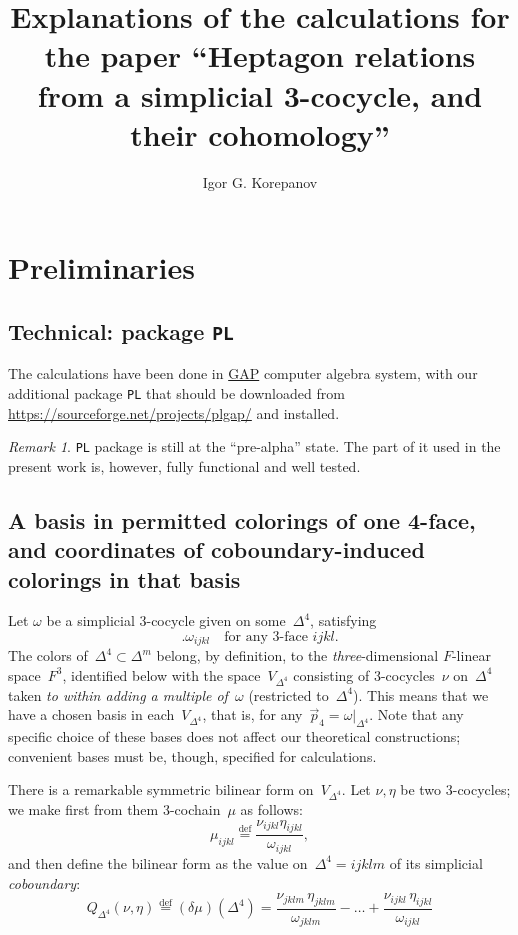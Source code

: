 \documentclass[12pt]{article}
\author{Igor G. Korepanov}
\title{Explanations of the calculations for the paper ``Heptagon relations from a simplicial 3-cocycle, and their cohomology''}
\date{}
\theoremstyle{definition}
\theoremstyle{remark}
\newtheorem*{remark}{Remark}
\begin{document}
\sloppy

\maketitle



\section{Preliminaries}\label{s:4f}

\subsection{Technical: package \texttt{PL}}

The calculations have been done in \href{https://www.gap-system.org/}{GAP} computer algebra system, with our additional package \texttt{PL} that should be downloaded from \href{https://sourceforge.net/projects/plgap/}{https://sourceforge.net/projects/plgap/} and installed.

\begin{remark}
 \texttt{PL} package is still at the ``pre-alpha'' state. The part of it used in the present work is, however, fully functional and well tested.
\end{remark}

\subsection{A basis in permitted colorings of one 4-face, and coordinates of coboundary-induced colorings in that basis}

Let $\omega$ be a simplicial 3-cocycle given on some~$\Delta^4$, satisfying
\begin{equation}\label{onv}.
 \omega _{ijkl} \quad \text{for any 3-face } ijkl.
\end{equation}
The colors of~$\Delta^4 \subset \Delta^m$ belong, by definition, to the \emph{three}-dimen\-sional $F$-linear space~$F^3$, identified below with the space~$V_{\Delta^4}$ consisting of 3-cocycles~$\nu$ on~$\Delta^4$ taken \emph{to within adding a multiple of~$\omega$} (restricted to~$\Delta^4$). This means that we have a chosen basis in each~$V_{\Delta^4}$, that is, for any~$\vec p_4 = \omega|_{\Delta^4}$. Note that any specific choice of these bases does not affect our theoretical constructions; convenient bases must be, though, specified for calculations.

There is a remarkable symmetric bilinear form on~$V_{\Delta^4}$. Let $\nu, \eta$ be two 3-cocycles; we make first from them 3-cochain~$\mu$ as follows:
\begin{equation}\label{mu}
\mu _{ijkl} \stackrel{\mathrm{def}}{=} \frac{\nu _{ijkl}\eta _{ijkl}}{\omega _{ijkl}},
\end{equation}
and then define the bilinear form as the value on~$\Delta^4 = ijklm$ of its simplicial \emph{coboundary}:
\begin{equation}\label{bf4}
Q_{\Delta^4}(\nu,\eta) \stackrel{\mathrm{def}}{=} (\delta \mu)( \Delta^4 ) = \frac{\nu _{jklm}\,\eta _{jklm}}{\omega _{jklm}} - \dots + \frac{\nu _{ijkl}\,\eta _{ijkl}}{\omega _{ijkl}}
\end{equation}
\end{document}
